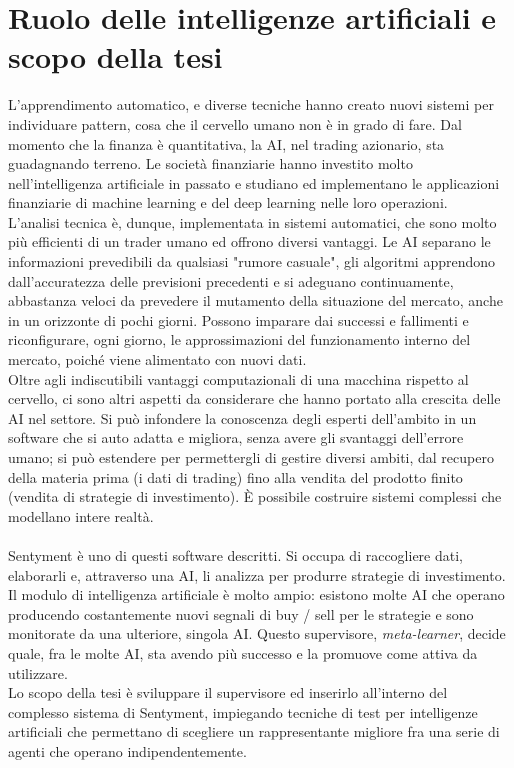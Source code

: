 \documentclass[a4paper,12pt]{report}
\begin{document}
\section{Ruolo delle intelligenze artificiali e scopo della tesi}		
L'apprendimento automatico, e diverse tecniche hanno creato nuovi sistemi per individuare pattern, cosa che il cervello umano non è in grado di fare. Dal momento che la finanza è quantitativa, la AI, nel trading azionario, sta guadagnando terreno. Le società finanziarie hanno investito molto nell'intelligenza artificiale in passato e studiano ed implementano le applicazioni finanziarie di machine learning e del deep learning nelle loro operazioni.\\
L'analisi tecnica è, dunque, implementata in sistemi automatici, che sono molto più efficienti di un trader umano ed offrono diversi vantaggi. Le AI separano le informazioni prevedibili da qualsiasi "rumore casuale", gli algoritmi apprendono dall'accuratezza delle previsioni precedenti e si adeguano continuamente, abbastanza veloci da prevedere il mutamento della situazione del mercato, anche in un orizzonte di pochi giorni. Possono imparare dai successi e fallimenti e riconfigurare, ogni giorno, le approssimazioni del funzionamento interno del mercato, poiché viene alimentato con nuovi dati.\\
Oltre agli indiscutibili vantaggi computazionali di una macchina rispetto al cervello, ci sono altri aspetti da considerare che hanno portato alla crescita delle AI nel settore. Si può infondere la conoscenza degli esperti dell'ambito in un software che si auto adatta e migliora, senza avere gli svantaggi dell'errore umano; si può estendere per permettergli di gestire diversi ambiti, dal recupero della materia prima (i dati di trading) fino alla vendita del prodotto finito (vendita di strategie di investimento). È possibile costruire sistemi complessi che modellano intere realtà.\\~\\
Sentyment è uno di questi software descritti. Si occupa di raccogliere dati, elaborarli e, attraverso una AI, li analizza per produrre strategie di investimento. Il modulo di intelligenza artificiale è molto ampio: esistono molte AI che operano producendo costantemente nuovi segnali di buy / sell per le strategie e sono monitorate da una ulteriore, singola AI. Questo supervisore, \textit{meta-learner}, decide quale, fra le molte AI, sta avendo più successo e la promuove come attiva da utilizzare.\\
Lo scopo della tesi è sviluppare il supervisore ed inserirlo all'interno del complesso sistema di Sentyment, impiegando tecniche di test per intelligenze artificiali che permettano di scegliere un rappresentante migliore fra una serie di agenti che operano indipendentemente.
\end{document}
